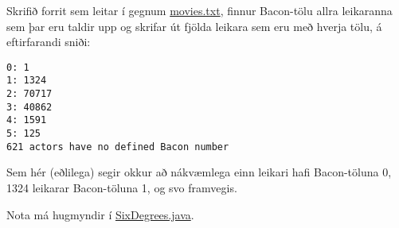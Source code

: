 \documentclass{article}
\begin{document}
Skrifið forrit sem leitar í gegnum \href{https://github.com/Ernir/kennsluefni/tree/master/T2/Code/w10/movies.txt}{movies.txt}, finnur Bacon-tölu allra leikaranna sem þar eru taldir upp og skrifar út fjölda leikara sem eru með hverja tölu, á eftirfarandi sniði:

\begin{verbatim}
0: 1
1: 1324
2: 70717
3: 40862
4: 1591
5: 125
621 actors have no defined Bacon number
\end{verbatim}

Sem hér (eðlilega) segir okkur að nákvæmlega einn leikari hafi Bacon-töluna 0, 1324 leikarar Bacon-töluna 1, og svo framvegis.

Nota má hugmyndir í \href{https://github.com/Ernir/kennsluefni/tree/master/T2/Code/w10/SixDegrees.java}{SixDegrees.java}.

\end{document}
